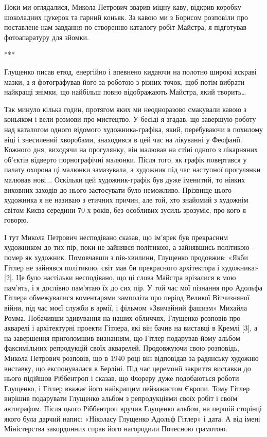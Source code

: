 Поки ми оглядалися, Микола Петрович зварив міцну каву, відкрив коробку
шоколадних цукерок та гарний коньяк. За кавою ми з Борисом розповіли про
поставлене нам завдання по створенню каталогу робіт Майстра, я підготував
фотоапаратуру для зйомки.

***

Глущенко писав етюд, енергійно і впевнено кидаючи на полотно широкі яскраві
мазки, а я фотографував його за роботою з різних точок, щоб потім вибрати
найкращі знімки, що найбільш повно відображають Майстра, який творить…

Так минуло кілька годин, протягом яких ми неодноразово смакували кавою з
коньяком і вели розмови про мистецтво. У бесіді я згадав, що завершую роботу
над каталогом одного відомого художника-графіка, який, перебуваючи в похилому
віці і знесилений хворобами, знаходився в цей час на лікуванні у Феофанії.
Кожного дня, виходячи на прогулянку, він малював на стіні одного з лікарняних
об'єктів відверто порнографічні малюнки. Після того, як графік повертався у
палату охорона ці малюнки замазувала, а художник під час наступної прогулянки
малював нові... Оскільки цей художник-графік був дуже іменитий, то ніяких
виховних заходів до нього застосувати було неможливо. Прізвище цього художника
я не називаю з етичних причин, але той, хто знайомий з художнім світом Києва
середини 70-х років, без особливих зусиль зрозуміє, про кого я говорю.

І тут Микола Петрович несподівано сказав, що ім'ярек був прекрасним художником
до тих пір, поки не зайнявся політикою, а зайнявшись політикою – помер як
художник. Помовчавши з пів-хвилини, Глущенко продовжив: «Якби Гітлер не
зайнявся політикою, світ мав би прекрасного архітектора і художника» [2]. Це
було настільки несподівано, що ці слова Майстра врізалися в мою пам'ять, і я
дослівно пам'ятаю їх до сих пір. У той час мої пізнання про Адольфа Гітлера
обмежувалися коментарями замполіта про період Великої Вітчизняної війни, під
час моєї служби в армії, і фільмом «Звичайний фашизм» Михайла Ромма. Побачивши
здивування на наших обличчях, Глущенко розповів про акварелі і архітектурні
проекти Гітлера, які він бачив на виставці в Кремлі [3], а на завершення
приголомшив визнанням, що Гітлер подарував йому альбом факсимільних репродукцій
своїх акварелей. Продовжуючи свою розповідь, Микола Петрович розповів, що в
1940 році він відповідав за радянську художню виставку, що експонувалася в
Берліні. Під час церемонії закриття виставки до нього підійшов Ріббентроп і
сказав, що Фюреру дуже подобаються роботи Глущенко, і Гітлер вважає його
найкращим пейзажистом Європи. Тому Гітлер вирішив подарувати Глущенко альбом з
репродукціями своїх робіт і своїм автографом. Після цього Ріббентроп вручив
Глущенко альбом, на першій сторінці якого була дарчий напис: «Ніколасу Глущенко
Адольф Гітлер» і дата. А від імені Міністерства закордонних справ його
нагородили Почесною грамотою.

